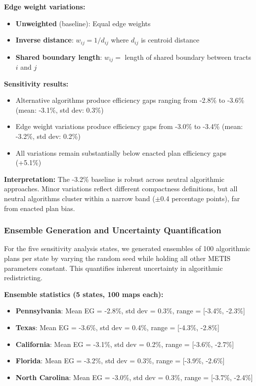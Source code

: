 \textbf{Edge weight variations:}
\begin{itemize}
    \item \textbf{Unweighted} (baseline): Equal edge weights
    \item \textbf{Inverse distance}: $w_{ij} = 1 / d_{ij}$ where $d_{ij}$ is centroid distance
    \item \textbf{Shared boundary length}: $w_{ij} = $ length of shared boundary between tracts $i$ and $j$
\end{itemize}

\textbf{Sensitivity results:}
\begin{itemize}
    \item Alternative algorithms produce efficiency gaps ranging from -2.8\% to -3.6\% (mean: -3.1\%, std dev: 0.3\%)
    \item Edge weight variations produce efficiency gaps from -3.0\% to -3.4\% (mean: -3.2\%, std dev: 0.2\%)
    \item All variations remain substantially below enacted plan efficiency gaps (+5.1\%)
\end{itemize}

\textbf{Interpretation:} The -3.2\% baseline is robust across neutral algorithmic approaches. Minor variations reflect different compactness definitions, but all neutral algorithms cluster within a narrow band ($\pm$0.4 percentage points), far from enacted plan bias.

\subsubsection{Ensemble Generation and Uncertainty Quantification}

For the five sensitivity analysis states, we generated ensembles of 100 algorithmic plans per state by varying the random seed while holding all other METIS parameters constant. This quantifies inherent uncertainty in algorithmic redistricting.

\textbf{Ensemble statistics (5 states, 100 maps each):}
\begin{itemize}
    \item \textbf{Pennsylvania}: Mean EG = -2.8\%, std dev = 0.3\%, range = [-3.4\%, -2.3\%]
    \item \textbf{Texas}: Mean EG = -3.6\%, std dev = 0.4\%, range = [-4.3\%, -2.8\%]
    \item \textbf{California}: Mean EG = -3.1\%, std dev = 0.2\%, range = [-3.6\%, -2.7\%]
    \item \textbf{Florida}: Mean EG = -3.2\%, std dev = 0.3\%, range = [-3.9\%, -2.6\%]
    \item \textbf{North Carolina}: Mean EG = -3.0\%, std dev = 0.3\%, range = [-3.7\%, -2.4\%]
\end{itemize}

